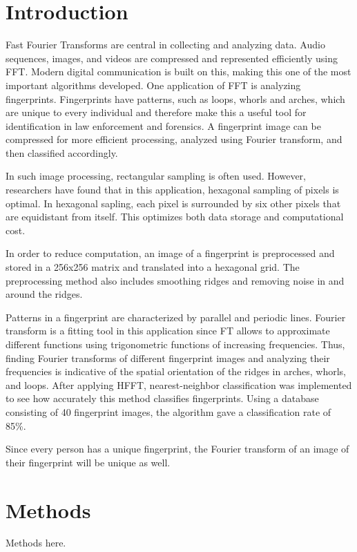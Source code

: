 \documentclass[letter]{amsart}
\begin{document}
\section*{Introduction}
Fast Fourier Transforms are central in collecting and analyzing data. Audio sequences, images, and videos are compressed and represented efficiently using FFT. Modern digital communication is built on this, making this one of the most important algorithms developed. One application of FFT is analyzing fingerprints. Fingerprints have patterns, such as loops, whorls and arches, which are unique to every individual and therefore make this a useful tool for identification in law enforcement and forensics. A fingerprint image can be compressed for more efficient processing, analyzed using Fourier transform, and then classified accordingly.

In such image processing, rectangular sampling is often used. However, researchers have found that in this application, hexagonal sampling of pixels is optimal. In hexagonal sapling, each pixel is surrounded by six other pixels that are equidistant from itself. This optimizes both data storage and computational cost.

In order to reduce computation, an image of a fingerprint is preprocessed and stored in a 256x256 matrix and translated into a hexagonal grid. The preprocessing method also includes smoothing ridges and removing noise in and around the ridges.

Patterns in a fingerprint are characterized by parallel and periodic lines. Fourier transform is a fitting tool in this application since FT allows to approximate different functions using trigonometric functions of increasing frequencies. Thus, finding Fourier transforms of different fingerprint images and analyzing their frequencies is indicative of the spatial orientation of the ridges in arches, whorls, and loops. After applying HFFT,  nearest-neighbor classification was implemented to see how accurately this method classifies fingerprints. Using a database consisting of 40 fingerprint images, the algorithm gave a classification rate of 85\%.

Since every person has a unique fingerprint, the Fourier transform of an image of their fingerprint will be unique as well. 


\section*{Methods}
Methods here.
\end{document}
